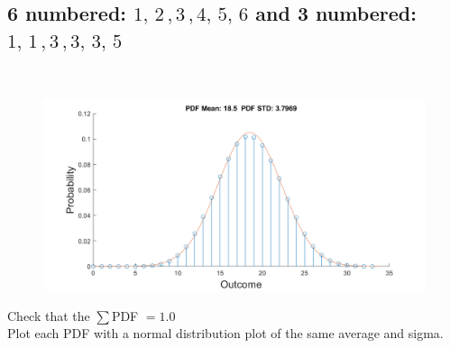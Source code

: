 \documentclass[12pt,letterpaper, onecolumn]{exam}
\begin{document}
\begin{questions}
\begin{parts}
        \part{6 numbered: $1,\,2\,,3\,,4,\,5,\,6$ and 3 numbered: $1,\,1\,,3\,,3,\,3,\,5$}\\
		        \solution
		        \begin{figure}[!h]
		            \centering
		            \includegraphics[width=.91\linewidth]{Q1_d.png}
		        \end{figure}
    \end{parts}
    Check that the $\sum$PDF $= 1.0$\\
    Plot each PDF with a normal distribution plot of the same average and sigma.\\


\end{questions}
\end{document}

